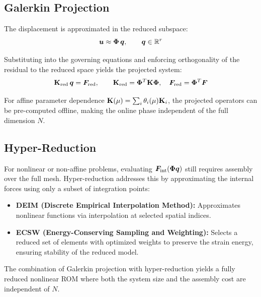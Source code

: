 \subsection{Galerkin Projection}

The displacement is approximated in the reduced subspace:
\begin{equation}
    \bm{u} \approx \mathbf{\Phi} \, \bm{q}, \qquad \bm{q} \in \mathbb{R}^r
\end{equation}

Substituting into the governing equations and enforcing orthogonality of the residual to the reduced space yields the projected system:
\begin{equation}
    \mathbf{K}_{\text{red}} \, \bm{q} = \bm{F}_{\text{red}}, \qquad \mathbf{K}_{\text{red}} = \mathbf{\Phi}^T \mathbf{K} \mathbf{\Phi}, \quad \bm{F}_{\text{red}} = \mathbf{\Phi}^T \bm{F}
\end{equation}

For affine parameter dependence $\mathbf{K}(\mu) = \sum_{i} \theta_i(\mu) \mathbf{K}_i$, the projected operators can be pre-computed offline, making the online phase independent of the full dimension $N$.

\subsection{Hyper-Reduction}

For nonlinear or non-affine problems, evaluating $\bm{F}_{\text{int}}(\mathbf{\Phi}\bm{q})$ still requires assembly over the full mesh. Hyper-reduction addresses this by approximating the internal forces using only a subset of integration points:

\begin{itemize}
    \item \textbf{DEIM (Discrete Empirical Interpolation Method):} Approximates nonlinear functions via interpolation at selected spatial indices.
    \item \textbf{ECSW (Energy-Conserving Sampling and Weighting):} Selects a reduced set of elements with optimized weights to preserve the strain energy, ensuring stability of the reduced model.
\end{itemize}

The combination of Galerkin projection with hyper-reduction yields a fully reduced nonlinear ROM where both the system size and the assembly cost are independent of $N$.
